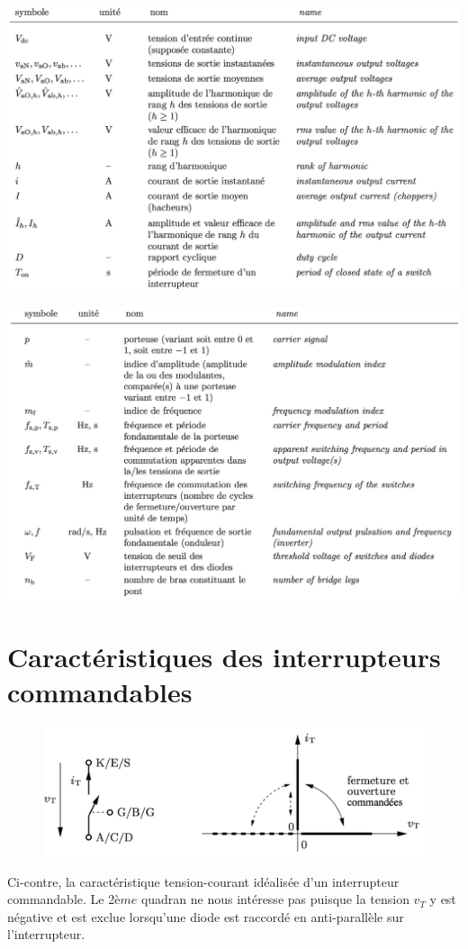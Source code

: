 	\begin{minipage}{0.5\textwidth}
		\includegraphics[scale=0.25]{ch4/2}
	\end{minipage}
	\begin{minipage}{0.5\textwidth}
		\vspace{3mm}
		\includegraphics[scale=0.25]{ch4/3}	
	\end{minipage}
	
\section{Caractéristiques des interrupteurs commandables}
	\begin{figure}
	\vspace{-5mm}
	\includegraphics[scale=0.25]{ch4/4}
	\end{figure}
	Ci-contre, la caractéristique tension-courant idéalisée d'un interrupteur commandable. Le 2${ème}$ quadran ne nous intéresse pas puisque la tension $v_T$ y est négative et est exclue lorsqu'une diode est raccordé en anti-parallèle sur l'interrupteur. \\
	

